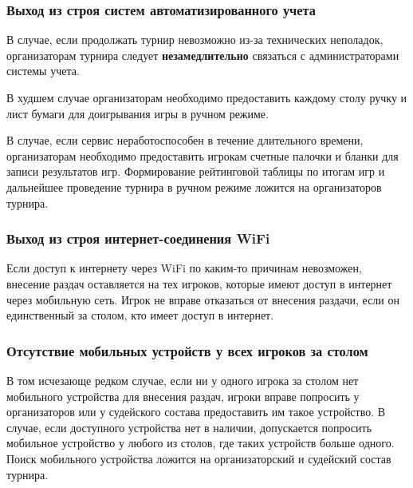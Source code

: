 \subsubsection{Выход из строя систем автоматизированного учета}

В случае, если продолжать турнир невозможно из-за технических неполадок, организаторам турнира следует \textbf{незамедлительно} связаться с администраторами системы учета. 

В худшем случае организаторам необходимо предоставить каждому столу ручку и лист бумаги для доигрывания игры в ручном режиме.

В случае, если сервис неработоспособен в течение длительного времени, организаторам необходимо предоставить игрокам счетные палочки и бланки для записи результатов игр. Формирование рейтинговой таблицы по итогам игр и дальнейшее проведение турнира в ручном режиме ложится на организаторов турнира.

\subsubsection{Выход из строя интернет-соединения WiFi}

Если доступ к интернету через WiFi по каким-то причинам невозможен, внесение раздач оставляется на тех игроков, которые имеют доступ в интернет через мобильную сеть. Игрок не вправе отказаться от внесения раздачи, если он единственный за столом, кто имеет доступ в интернет.

\subsubsection{Отсутствие мобильных устройств у всех игроков за столом}

В том исчезающе редком случае, если ни у одного игрока за столом нет мобильного устройства для внесения раздач, игроки вправе попросить у организаторов или у судейского состава предоставить им такое устройство. В случае, если доступного устройства нет в наличии, допускается попросить мобильное устройство у любого из столов, где таких устройств больше одного. Поиск мобильного устройства ложится на организаторский и судейский состав турнира.

